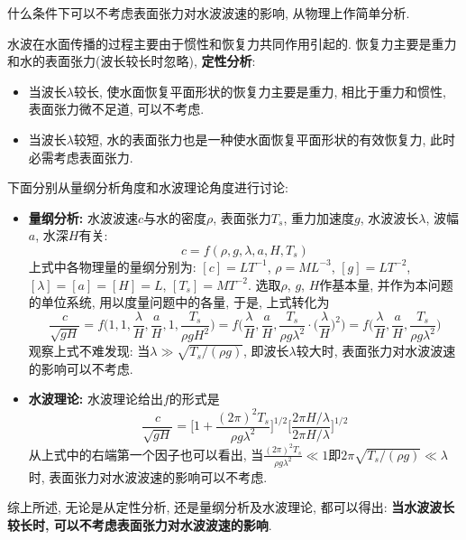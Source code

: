\begin{problem}[16]
什么条件下可以不考虑表面张力对水波波速的影响, 从物理上作简单分析.
\end{problem}
\begin{solution}
水波在水面传播的过程主要由于惯性和恢复力共同作用引起的. 恢复力主要是重力和水的表面张力(波长较长时忽略), \textbf{定性分析}:

\vspace{5pt}

\noindent
\begin{minipage}[c]{0.7\linewidth}
\begin{itemize} 
\item 当波长$\lambda$较长, 使水面恢复平面形状的恢复力主要是重力, 相比于重力和惯性, 表面张力微不足道, 可以不考虑. 
\item 当波长$\lambda$较短, 水的表面张力也是一种使水面恢复平面形状的有效恢复力, 此时必需考虑表面张力.
\end{itemize}
\end{minipage}
\begin{minipage}[c]{0.3\linewidth}
\begin{center}

\end{center}
\end{minipage}\vspace{10pt}

\noindent
下面分别从量纲分析角度和水波理论角度进行讨论:
\begin{itemize}
\item \textbf{量纲分析:}
水波波速$c$与水的密度$\rho$, 表面张力$T_s$, 重力加速度$g$, 水波波长$\lambda$, 波幅$a$, 水深$H$有关:
\[
c = f(\rho,g,\lambda,a,H,T_s)
\]
上式中各物理量的量纲分别为: $[c]=LT^{-1}$, $\rho=ML^{-3}$, $[g]=LT^{-2}$, $[\lambda]=[a]=[H]=L$, $[T_s]=MT^{-2}$. 选取$\rho$, $g$, $H$作基本量, 并作为本问题的单位系统, 用以度量问题中的各量, 于是, 上式转化为
\[
\frac{c}{\sqrt{gH}} = f\bigg(1,1,\frac{\lambda}{H}, \frac{a}{H}, 1, \frac{T_s}{\rho g H^2}\bigg) = f\bigg(\frac{\lambda}{H},\frac{a}{H},\frac{T_s}{\rho g \lambda^2}\cdot\Big(\frac{\lambda}{H}\Big)^2\bigg) = f\bigg(\frac{\lambda}{H}, \frac{a}{H}, \frac{T_s}{\rho g \lambda^2}\bigg)
\]
观察上式不难发现: 当$\lambda\gg \sqrt{T_s/(\rho g)}$, 即波长$\lambda$较大时, 表面张力对水波波速的影响可以不考虑.

\item \textbf{水波理论:}
水波理论给出$f$的形式是
\[
\frac{c}{\sqrt{gH}} = \bigg[1+\frac{(2\pi)^2T_s}{\rho g \lambda^2}\bigg]^{1/2}\bigg[\frac{2\pi H/\lambda}{2\pi H/\lambda}\bigg]^{1/2}
\]
从上式中的右端第一个因子也可以看出, 当$\frac{(2\pi)^2T_s}{\rho g \lambda^2}\ll 1$即$2\pi\sqrt{T_s/(\rho g)}\ll \lambda$时, 表面张力对水波波速的影响可以不考虑.
\end{itemize}
综上所述, 无论是从定性分析, 还是量纲分析及水波理论, 都可以得出: \textbf{当水波波长较长时, 可以不考虑表面张力对水波波速的影响}.
\end{solution}

